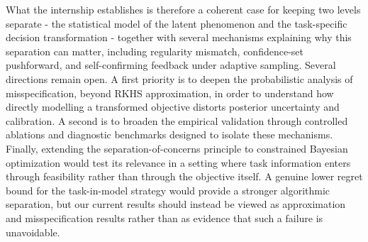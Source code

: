 What the internship establishes is therefore a coherent case for keeping two
levels separate - the statistical model of the latent phenomenon and the
task-specific decision transformation - together with several mechanisms
explaining why this separation can matter, including regularity mismatch,
confidence-set pushforward, and self-confirming feedback under adaptive sampling.
Several directions remain open. A first priority is to deepen the probabilistic
analysis of misspecification, beyond RKHS approximation, in order to understand
how directly modelling a transformed objective distorts posterior uncertainty and
calibration. A second is to broaden the empirical validation through controlled
ablations and diagnostic benchmarks designed to isolate these mechanisms. Finally,
extending the separation-of-concerns principle to constrained Bayesian
optimization would test its relevance in a setting where task information enters
through feasibility rather than through the objective itself. A genuine lower
regret bound for the task-in-model strategy would provide a stronger algorithmic
separation, but our current results should instead be viewed as approximation and
misspecification results rather than as evidence that such a failure is
unavoidable.
